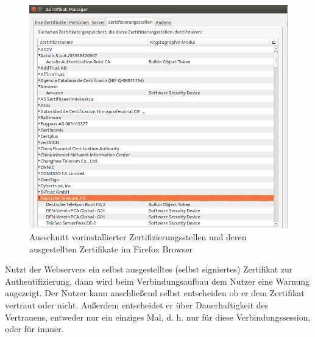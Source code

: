 \begin{figure}[H]
		\centering
		\includegraphics[width=0.5\linewidth]{images/Zertifizierungsstellen.png}
		\caption{Ausschnitt vorinstallierter Zertifizierungsstellen und deren ausgestellten Zertifikate im Firefox Browser}
\end{figure}
\noindent
Nutzt der Webservers ein selbst ausgestelltes (selbst signiertes) Zertifikat zur Authentifizierung, dann wird beim Verbindungsaufbau dem Nutzer eine Warnung angezeigt. Der Nutzer kann anschließend selbst entscheiden ob er dem Zertifikat vertraut oder nicht. Außerdem entscheidet er über Dauerhaftigkeit des Vertrauens, entweder nur ein einziges Mal, d. h. nur für diese Verbindungssession, oder für immer. 

